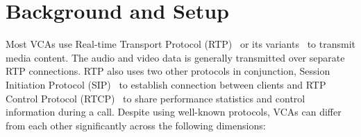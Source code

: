\section{Background and Setup}


\label{sec:background}
Most VCAs use Real-time Transport Protocol (RTP)~\cite{schulzrinne1996rtp, schulzrinne2003rfc3550} or its variants~\cite{baugher2004secure, zoom_rtp} to transmit media content. The audio and video data is generally transmitted over separate RTP connections. RTP also uses two other protocols in conjunction, Session Initiation Protocol (SIP)~\cite{rosenberg2002sip} to establish connection between clients and RTP Control Protocol (RTCP)~\cite{schulzrinne2003rfc3550} to share performance statistics and control information during a call. Despite using well-known protocols, VCAs can differ from each other significantly across the following dimensions:


